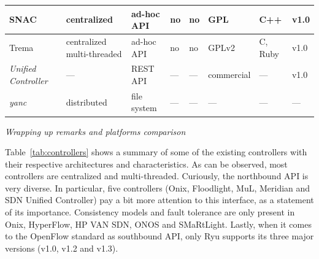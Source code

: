 {\begin{table}[!htp]
\begin{center}
\begin{tabularx}{\linewidth}{p{2.94cm}Xp{2.29cm}p{1.47cm}p{0.75cm}p{1.35cm}p{2.1cm}p{0.9cm}}
SNAC~\cite{appenzeller2011} & centralized & ad-hoc API & no & no & GPL & C++ & v1.0 \\
\hline

Trema~\cite{takamiya2012}      & centralized multi-threaded  & ad-hoc API & no & no & GPLv2 & C, Ruby & v1.0 \\
\hline
\textit{Unified Controller}~\cite{racherla2014} & --- & REST API & --- & --- & commercial & --- & v1.0 \\
\hline
\textit{yanc}~\cite{monaco2013} & distributed & file system & --- & --- & --- & --- & --- \\
\hline

\end{tabularx}
\end{center}
\end{table}
}

\vspace{2mm}
\noindent \textit{Wrapping up remarks and platforms comparison}

Table~\ref{tab:controllers} shows a summary of some of the existing controllers with their respective 
architectures and characteristics.
As can be observed, most controllers are centralized and multi-threaded.
Curiously, the northbound API is very diverse. In particular, five controllers (Onix, Floodlight, MuL, Meridian and SDN Unified Controller) pay a bit more attention to this interface, as a statement
of its importance. Consistency models and fault tolerance are only present in Onix, HyperFlow, HP VAN SDN,  ONOS and SMaRtLight. Lastly, when it comes to the OpenFlow standard as southbound API, only Ryu supports its three 
major versions (v1.0, v1.2 and v1.3).



